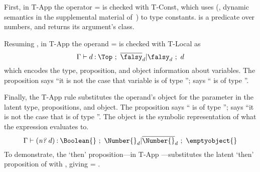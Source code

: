 First, in T-App the operator \e{} = \numberhuh{} is checked with T-Const, which
uses 
\constanttypeliteral{} (, dynamic semantics in the supplemental material
of~\cite{bonnaire2016practical})
to type constants.
\numberhuh{} is a predicate over numbers, and
\classconst{} returns its argument's class.

Resuming {},
in T-App the operand \ep{} =  is checked with
T-Local as
\begin{equation}
\judgementselfrewrite{\propenv{}}
                     {\makelocal{d}}
                     {\Top}
                     {\filterset{\notprop{\falsy}{\makelocal{d}}}
                                {\isprop{\falsy}{\makelocal{d}}}}
                     {\makelocal{d}}
\end{equation}
which encodes the type, proposition, and object information
about variables. The proposition {}
says ``it is not the case that variable {} is of type {\falsy}'';
{} says ``{} is of type {\falsy}''.

Finally, the T-App rule substitutes the operand's object \objectp{}
for the parameter \x{} in the latent type, propositions, and object. The proposition
{} says ``{} is of type {\Number{}}'';
{} says ``it is not the case that {}
is of type {\Number{}}''. The object {} is the symbolic representation
of what the expression {} evaluates to.
\begin{equation}
\judgementselfrewrite{\propenv{}}
  {\appexp{\numberhuh{}}{\makelocal{d}}}
  {\Boolean{}}
  {\filterset{\isprop{\Number{}}{\makelocal{d}}}
             {\notprop{\Number{}}{\makelocal{d}}}}
  {\emptyobject{}}
\end{equation}
To demonstrate, the `then' proposition---in T-App {\replacefor {\thenprop{\prop{}}} {\objectp{}} {\x{}}}---substitutes
the latent `then' proposition of \constanttype{\numberhuh{}} with 
, giving
{\replacefor {\isprop{\Number{}}{\x{}}} {} {\x{}}} =
{}.

